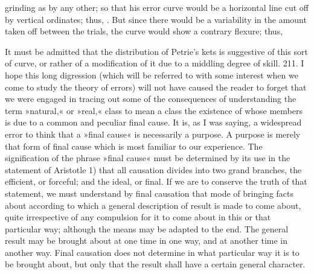 grinding as by any other; so that his error curve would be a horizontal line cut off by vertical ordinates; thus, . But since there would be a variability in the amount taken off between the trials, the curve would show a contrary flexure; thus,
    
It must be admitted that the distribution of Petrie's kets is suggestive of this sort of curve, or rather of a modification of it due to a middling degree of skill.
211. I hope this long digression (which will be referred to with some interest when we come to study the theory of errors) will not have caused the reader to forget that we were engaged in tracing out some of the consequences of understanding the term »natural,« or »real,« class to mean a class the existence of whose members is due to a common and peculiar final cause. It is, as I was saying, a widespread error to think that a »final cause« is necessarily a purpose. A purpose is merely that form of final cause which is most familiar to our experience. The signification of the phrase »final cause« must be determined by its use in the statement of Aristotle 1) that all causation divides into two grand branches, the efficient, or forceful; and the ideal, or final. If we are to conserve the truth of that statement, we must understand by final causation that mode of bringing facts about according to which a general description of result is made to come about, quite irrespective of any compulsion for it to come about in this or that particular way; although the means may be adapted to the end. The general result may be brought about at one time in one way, and at another time in another way. Final causation does not determine in what particular way it is to be brought about, but only that the result shall have a certain general character.